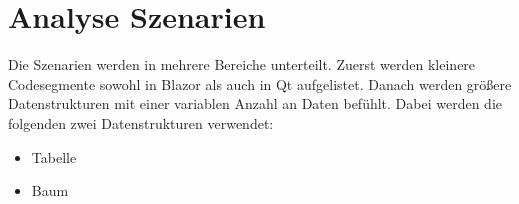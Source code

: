 \section{Analyse Szenarien}
Die Szenarien werden in mehrere
Bereiche unterteilt. Zuerst werden kleinere Codesegmente sowohl in Blazor als
auch in Qt aufgelistet. Danach werden größere Datenstrukturen mit einer variablen Anzahl an Daten
befühlt. Dabei werden die folgenden zwei Datenstrukturen verwendet:

\begin{itemize}
    \item Tabelle
    \item Baum
\end{itemize}




